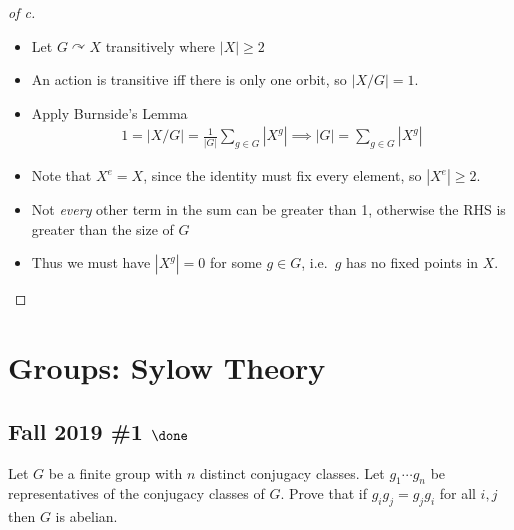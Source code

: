 \begin{solution}
\begin{proof}[of c]
\begin{itemize}
\tightlist
\item
  Let \(G\curvearrowright X\) transitively where
  \({\left\lvert {X} \right\rvert} \geq 2\)
\item
  An action is transitive iff there is only one orbit, so
  \({\left\lvert {X/G} \right\rvert} = 1\).
\item
  Apply Burnside's Lemma
  \begin{align*}
  1 = {\left\lvert {X/G} \right\rvert} = \frac{1}{{\left\lvert {G} \right\rvert}} \sum_{g\in G} {\left\lvert {X^g} \right\rvert} \implies {\left\lvert {G} \right\rvert} = \sum_{g\in G} {\left\lvert {X^g} \right\rvert}
  \end{align*}
\item
  Note that \(X^e = X\), since the identity must fix every element, so
  \({\left\lvert {X^e} \right\rvert} \geq 2\).
\item
  Not \emph{every} other term in the sum can be greater than 1,
  otherwise the RHS is greater than the size of \(G\)
\item
  Thus we must have \({\left\lvert {X^g} \right\rvert} = 0\) for some
  \(g\in G\), i.e.~\(g\) has no fixed points in \(X\).
\end{itemize}

\end{proof}

\end{solution}

\hypertarget{groups-sylow-theory}{%
\section{Groups: Sylow Theory}\label{groups-sylow-theory}}

\hypertarget{fall-2019-1-done}{%
\subsection{\texorpdfstring{Fall 2019 \#1
\(\done\)}{Fall 2019 \#1 \textbackslash done}}\label{fall-2019-1-done}}

Let \(G\) be a finite group with \(n\) distinct conjugacy classes. Let
\(g_1 \cdots g_n\) be representatives of the conjugacy classes of \(G\).
Prove that if \(g_i g_j = g_j g_i\) for all \(i, j\) then \(G\) is
abelian.

